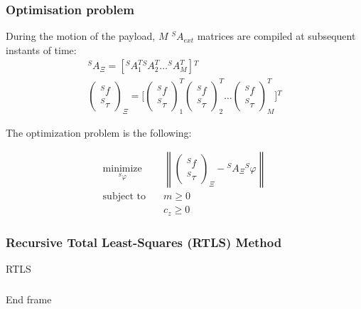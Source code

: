 \documentclass[usenames,dvipsnames]{beamer}
\newcommand{\norm}[1]{\left\lVert#1\right\rVert}
\begin{document}
\begin{frame}
 \frametitle{Optimisation problem}

During the motion of the payload, $M$ ${}^S A_{ext}$ matrices are compiled at subsequent instants of time:
\begin{gather}
  {}^S A_{\Xi} = [{}^S A_1^T {}^S A_2^T \ldots {}^S A_M^T] {}^T \\
  \begin{pmatrix}
   {}^S f    \\
   {}^S \tau
  \end{pmatrix}_{\Xi}
  = \Bigg[\begin{pmatrix}
   {}^S f    \\
   {}^S \tau
  \end{pmatrix}_1^T
  \begin{pmatrix}
   {}^S f    \\
   {}^S \tau
  \end{pmatrix}_2^T
  \ldots \begin{pmatrix}
   {}^S f    \\
   {}^S \tau
  \end{pmatrix}_M^T \Bigg] {}^T
\end{gather}

The optimization problem is the following:

\begin{align*}
  \underset{{}^S \varphi}{\textrm{minimize}} \quad &
    \norm{ \begin{pmatrix}
     {}^S f    \\
     {}^S \tau
   \end{pmatrix}_{\Xi}
    - {}^S A_{\Xi} {}^S \varphi } \\
  \textrm{subject \ to} \quad & m \geq 0\\
                              & c_z \geq 0
\end{align*}

\end{frame}


\begin{frame}
 \frametitle{Recursive Total Least-Squares (RTLS) Method}
RTLS
\end{frame}

\begin{frame}
 \frametitle{}
End frame
\end{frame}
\end{document}
